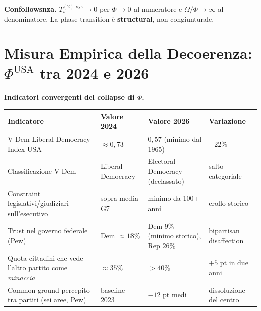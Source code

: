 \Proved{} \textbf{Confollowsnza.} \(T_s^{(2),\text{sys}} \to 0\) per
\(\Phi \to 0\) al numeratore e \(\Omega/\Phi \to \infty\) al
denominatore. La phase transition è \textbf{structural}, non
congiunturale.



\section{\texorpdfstring{Misura Empirica della Decoerenza:
\(\Phi^{\text{USA}}\) tra 2024 e
2026}{Misura Empirica della Decoerenza: \textbackslash Phi\^{}\{\textbackslash text\{USA\}\} tra 2024 e 2026}}\label{misura-empirica-della-decoherence-phitextusa-tra-2024-e-2026}

\Proved{} \textbf{Indicatori convergenti del collapse di \(\Phi\).}

{\def\LTcaptype{none} %
{\small\begin{longtable}[]{@{}
  >{\raggedright\arraybackslash}p{}
  >{\raggedright\arraybackslash}p{}
  >{\raggedright\arraybackslash}p{}
  >{\raggedright\arraybackslash}p{}@{}}
\toprule\noalign{}
\begin{minipage}[b]{\linewidth}\raggedright
Indicatore
\end{minipage} & \begin{minipage}[b]{\linewidth}\raggedright
Valore 2024
\end{minipage} & \begin{minipage}[b]{\linewidth}\raggedright
Valore 2026
\end{minipage} & \begin{minipage}[b]{\linewidth}\raggedright
Variazione
\end{minipage} \\
\midrule\noalign{}
\endhead
\bottomrule\noalign{}
\endlastfoot
V-Dem Liberal Democracy Index USA & \(\approx 0{,}73\) & \(0{,}57\)
(minimo dal 1965) & \(-22\%\) \\
Classificazione V-Dem & Liberal Democracy & Electoral Democracy
(declassato) & salto categoriale \\
Constraint legislativi/giudiziari sull'esecutivo & sopra media G7 &
minimo da 100+ anni & crollo storico \\
Trust nel governo federale (Pew) & Dem \(\approx 18\%\) & Dem \(9\%\)
(minimo storico), Rep \(26\%\) & bipartisan disaffection \\
Quota cittadini che vede l'altro partito come \emph{minaccia} &
\(\approx 35\%\) & \(> 40\%\) & \(+5\) pt in due anni \\
Common ground percepito tra partiti (sei aree, Pew) & baseline 2023 &
\(-12\) pt medi & dissoluzione del centro \\
\end{longtable}}
}

